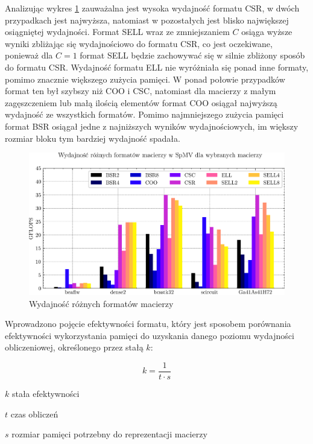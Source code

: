 Analizując wykres \ref{all_plot} zauważalna jest wysoka wydajność formatu CSR, w dwóch przypadkach jest najwyższa, natomiast w pozostałych jest blisko największej osiągniętej wydajności. 
Format SELL wraz ze zmniejszaniem $C$ osiąga wyższe wyniki zbliżając się wydajnościowo do formatu CSR, co jest oczekiwane, ponieważ dla $C = 1$ format SELL będzie zachowywać się w silnie zbliżony sposób do formatu CSR.
Wydajność formatu ELL nie wyróżniała się ponad inne formaty, pomimo znacznie większego zużycia pamięci.
W ponad połowie przypadków format ten był szybszy niż COO i CSC, natomiast dla macierzy z małym zagęszczeniem lub małą ilością elementów format COO osiągał najwyższą wydajność ze wszystkich formatów.
Pomimo najmniejszego zużycia pamięci format BSR osiągał jedne z najniższych wyników wydajnościowych, im większy rozmiar bloku tym bardziej wydajność spadała.

\begin{figure}[!htb]
    \centering
    \includegraphics[width=\linewidth]{result_plots/barchart.png}
    \caption{Wydajność różnych formatów macierzy}\label{all_plot}
\end{figure}

Wprowadzono pojęcie efektywności formatu, który jest sposobem porównania efektywności wykorzystania pamięci do uzyskania danego poziomu wydajności obliczeniowej, określonego przez stałą $k$:

\begin{equation}
    k = \frac{1}{t \cdot s}
\end{equation}

\begin{eqwhere}[2cm]
	\item[$k$] stała efektywności
	\item[$t$] czas obliczeń
    \item[$s$] rozmiar pamięci potrzebny do reprezentacji macierzy
\end{eqwhere}

